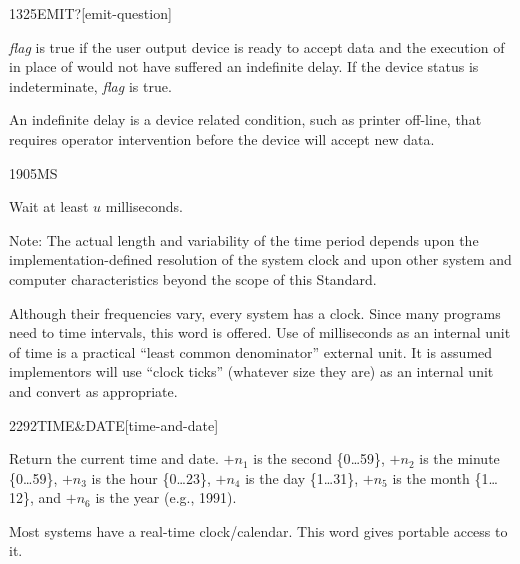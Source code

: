 \begin{newword}{1325}{EMIT?}[emit-question]

	\emph{flag} is true if the user output device is ready to
	accept data and the execution of  in place of
	 would not have suffered an indefinite delay. If
	the device status is indeterminate, \emph{flag} is true.

	\begin{rationale} %
		An indefinite delay is a device related condition, such as
		printer off-line, that requires operator intervention before
		the device will accept new data.
	\end{rationale}
\end{newword}


\begin{newword}{1905}{MS}

	Wait at least $u$ milliseconds.

\item[Note:]
	The actual length and variability of the time period depends
	upon the implementation-defined resolution of the system clock
	and upon other system and computer characteristics beyond the
	scope of this Standard.

	\begin{rationale} %
		Although their frequencies vary, every system has a clock.
		Since many programs need to time intervals, this word is
		offered. Use of milliseconds as an internal unit of time is
		a practical ``least common denominator'' external unit. It
		is assumed implementors will use ``clock ticks'' (whatever
		size they are) as an internal unit and convert as appropriate.
	\end{rationale}
\end{newword}


\begin{newword}[TIMEandDATE]{2292}{TIME\&DATE}[time-and-date]

	Return the current time and date.
	$+n_1$ is the second \{0{\ldots}59\},
	$+n_2$ is the minute \{0{\ldots}59\},
	$+n_3$ is the hour \{0{\ldots}23\},
	$+n_4$ is the day \{1{\ldots}31\},
	$+n_5$ is the month \{1{\ldots}12\}, and
	$+n_6$ is the year (e.g., 1991).

	\begin{rationale} %
		Most systems have a real-time clock/calendar.
		This word gives portable access to it.
	\end{rationale}
\end{newword}
